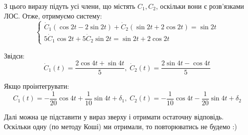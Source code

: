 \documentclass[14pt]{extarticle}
\begin{document}
З цього виразу підуть усі члени, що містять $C_1,C_2$, оскільки вони є розв'язками ЛОС. Отже, отримуємо систему:
\[
\begin{cases}
    \dot{C}_1 (\cos 2t - 2\sin 2t) + \dot{C}_2(\sin 2t + 2\cos 2t) = \sin 2t \\ 5\dot{C}_1 \cos 2t + 5\dot{C}_2 \sin 2t = \sin 2t + 2\cos 2t 
\end{cases}
\]

Звідси:
\[
\dot{C}_1(t) = \frac{2\cos 4t + \sin 4t}{5},\;\dot{C}_2(t) = \frac{2\sin 4t-\cos 4t}{5}  
\]

Якщо проінтегрувати:
\[
C_1(t) = -\frac{1}{20}\cos 4t + \frac{1}{10}\sin 4t + \delta_1, \; C_2(t)=-\frac{1}{10}\cos 4t - \frac{1}{20}\sin 4t + \delta_2
\]

Далі можна це підставити у вираз зверху і отримати остаточну відповідь. Оскільки одну (по методу Коші) ми отримали, то повторюватись не будемо :)
\end{document}

